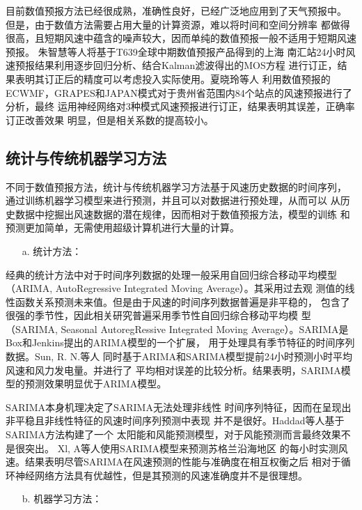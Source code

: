 \documentclass[AutoFakeBold]{LZUThesis}
\begin{document}
目前数值预报方法已经很成熟，准确性良好，已经广泛地应用到了天气预报中。
但是，由于数值方法需要占用大量的计算资源，难以将时间和空间分辨率
都做得很高，且短期风速中蕴含的噪声较大，因而单纯的数值预报一般不适用于短期风速预报。
朱智慧等人\cite{朱智慧2010T639}将基于T639全球中期数值预报产品得到的上海
南汇站24小时风速预报结果利用逐步回归分析、结合Kalman滤波得出的MOS方程
进行订正，结果表明其订正后的精度可以考虑投入实际使用。夏晓玲等人
\cite{夏晓玲2019贵州省数值预报风速产品检验及订正}利用数值预报的
ECWMF，GRAPES和JAPAN模式对于贵州省范围内84个站点的风速预报进行了分析，最终
运用神经网络对3种模式风速预报进行订正，结果表明其误差，正确率订正改善效果
明显，但是相关系数的提高较小。

\subsection{统计与传统机器学习方法}
不同于数值预报方法，统计与传统机器学习方法基于风速历史数据的时间序列，
通过训练机器学习模型来进行预测，并且可以对数据进行预处理，从而可以
从历史数据中挖掘出风速数据的潜在规律，因而相对于数值预报方法，模型的训练
和预测更加简单，无需使用超级计算机进行大量的计算。

\begin{itemize}
\item[a. ] 统计方法：
\end{itemize}

经典的统计方法中对于时间序列数据的处理一般采用自回归综合移动平均模型
（ARIMA, AutoRegressive Integrated Moving Average）。其采用过去观
测值的线性函数关系预测未来值。但是由于风速的时间序列数据普遍是非平稳的，
包含了很强的季节性，因此相关研究普遍采用季节性自回归综合移动平均模
型（SARIMA, Seasonal AutoregRessive Integrated 
Moving Average）。SARIMA是Box和Jenkins提出的ARIMA模型的一个扩展，
用于处理具有季节特征的时间序列数据。Sun, R. N.等人\cite{2017Forecast}
同时基于ARIMA和SARIMA模型提前24小时预测小时平均风速和风力发电量。并进行了
平均相对误差的比较分析。结果表明，SARIMA模型的预测效果明显优于ARIMA模型。

SARIMA本身机理决定了SARIMA无法处理非线性
时间序列特征，因而在呈现出非平稳且非线性特征的风速时间序列预测中表现
并不是很好。Haddad等人\cite{haddad2019wind}基于SARIMA方法构建了一个
太阳能和风能预测模型，对于风能预测而言最终效果不是很突出。
Xl, A等人\cite{2021Short}使用SARIMA模型来预测苏格兰沿海地区
的每小时实测风速。结果表明尽管SARIMA在风速预测的性能与准确度在相互权衡之后
相对于循环神经网络方法具有优越性，但是其预测的风速准确度并不是很理想。

\begin{itemize}
\item[b. ] 机器学习方法：
\end{itemize}
 
\end{document}
